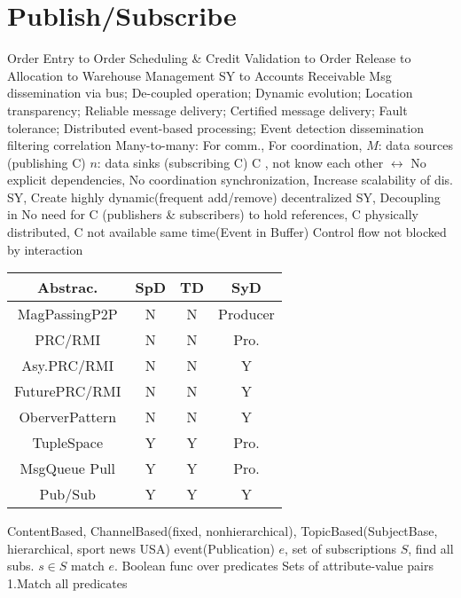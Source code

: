\section{Publish/Subscribe}
Order Entry
to
Order Scheduling
\&
Credit Validation
to
Order Release
to
Allocation
to 
Warehouse Management SY
to
Accounts Receivable
Msg dissemination via bus;
De-coupled operation;
Dynamic evolution;
Location transparency;
Reliable message delivery;
Certified message delivery;
Fault tolerance;
Distributed event-based processing;
Event detection 
dissemination 
filtering 
correlation 
Many-to-many:
For comm.,
For coordination,
$M$: data sources (publishing C)
$n$: data sinks (subscribing C)
\greentext{+}
C ,
not know each other
$\leftrightarrow$
No explicit dependencies, 
No coordination synchronization, 
Increase scalability of dis. SY,
Create highly dynamic(frequent add/remove) decentralized SY,
Decoupling in 
No need for C (publishers \& subscribers) to hold references, C physically distributed,
C not available same time(Event in Buffer)
Control flow not blocked by interaction
\begin{tabular}{c|c|c|c}
  \hline			
  Abstrac.&SpD&TD&SyD\\
  \hline
  MagPassingP2P&N&N& Producer\\
  PRC/RMI&N&N&Pro.\\
  Asy.PRC/RMI&N&N&Y\\
  FuturePRC/RMI&N&N&Y\\
  OberverPattern&N&N&Y\\
  TupleSpace&Y&Y&Pro.\\
  MsgQueue Pull&Y&Y&Pro.\\
  Pub/Sub&Y&Y&Y\\
  \hline
\end{tabular}
ContentBased, 
ChannelBased(fixed, nonhierarchical), 
TopicBased(SubjectBase, hierarchical, sport news USA)
event(Publication) $e$, 
set of subscriptions $S$, 
find all subs. $s\in S$ match $e$.
Boolean func over predicates
Sets of attribute-value pairs
\\
1.Match all predicates 

